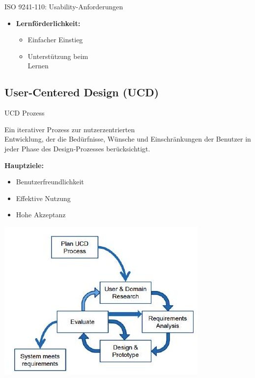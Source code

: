 \begin{theorem}{ISO 9241-110: Usability-Anforderungen}
\begin{minipage}[t]{0.4\linewidth}
\begin{itemize}
    \item \textbf{Lernförderlichkeit:}
    \begin{itemize}
        \item Einfacher Einstieg
        \item Unterstützung beim \\ Lernen
    \end{itemize}
\end{itemize}
\end{minipage}
\end{theorem}

\subsection{User-Centered Design (UCD)}

\begin{concept}{UCD Prozess}

\begin{minipage}{0.4\linewidth}
Ein iterativer Prozess zur nutzerzentrierten \\ Entwicklung, der die Bedürfnisse, Wünsche und Einschränkungen 
der Benutzer in jeder Phase des Design-Prozesses berücksichtigt.

\textbf{Hauptziele:}
\begin{itemize}
    \item Benutzerfreundlichkeit
    \item Effektive Nutzung
    \item Hohe Akzeptanz
\end{itemize}
\end{minipage}
\begin{minipage}{0.6\linewidth}
    \vspace{-5mm}
    \includegraphics[width=\linewidth]{images/2024_12_29_0d1d7b5551ea1b4b41bdg-03}
\end{minipage}
\end{concept}

